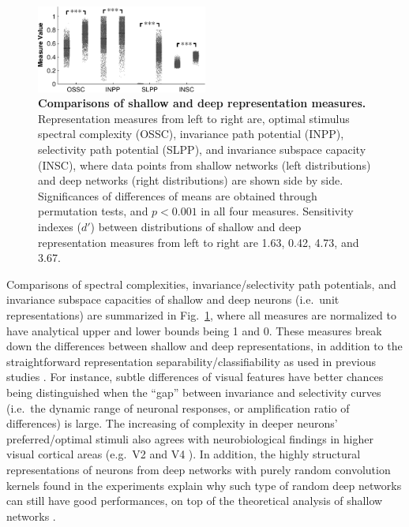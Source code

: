 \begin{figure}
\centering \includegraphics[width=0.5\textwidth]{Figs/e_fig23b-crop.pdf}
\caption{
{\bf Comparisons of shallow and deep representation measures.} Representation measures from left to right are, optimal stimulus spectral complexity (OSSC), invariance path potential (INPP), selectivity path potential (SLPP), and invariance subspace capacity (INSC), where data points from shallow networks (left distributions) and deep networks (right distributions) are shown side by side. Significances of differences of means are obtained through permutation tests, and $p < 0.001$ in all four measures. Sensitivity indexes ($d'$) between distributions of shallow and deep representation measures from left to right are 1.63, 0.42, 4.73, and 3.67.} %
\label{fig:ind_mea}
\end{figure}

Comparisons of spectral complexities, invariance/selectivity path potentials, and invariance subspace capacities of shallow and deep neurons (i.e.~unit representations) are summarized in Fig.~\ref{fig:ind_mea}, where all measures are normalized to have analytical upper and lower bounds being 1 and 0. These measures break down the differences between shallow and deep representations, in addition to the straightforward representation separability/classifiability as used in previous studies \cite{donahue2014decaf, zeiler2014visualizing}. For instance, subtle differences of visual features have better chances being distinguished when the ``gap'' between invariance and selectivity curves (i.e.~the dynamic range of neuronal responses, or amplification ratio of differences) is large. The increasing of complexity in deeper neurons' preferred/optimal stimuli also agrees with neurobiological findings in higher visual cortical areas (e.g.~V2 and V4 \cite{hegde2000selectivity, pasupathy2001shape}). In addition, the highly structural representations of neurons from deep networks with purely random convolution kernels found in the experiments explain why such type of random deep networks can still have good performances, on top of the theoretical analysis of shallow networks \cite{saxe2011random}. 

